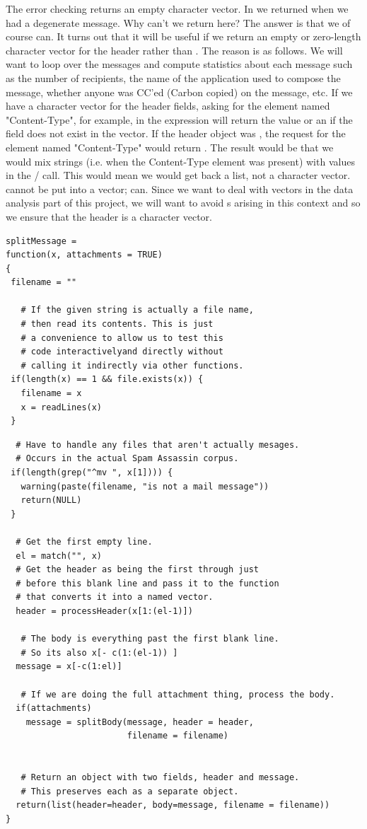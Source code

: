 The error checking returns an empty character vector.  In
 we returned  when
we had a degenerate message.  Why can't we return  here?  The
answer is that we of course can.  It turns out that it will be useful
if we return an empty or zero-length character vector for the header
rather than .  The reason is as follows.  We will want to
loop over the messages and compute statistics about each message such
as the number of recipients, the name of the application used to
compose the message, whether anyone was CC'ed (Carbon copied) on the
message, etc.  If we have a character vector for the header fields,
asking for the element named "Content-Type", for example, in the
expression
 will
return the value or an  if the field does not exist in the
vector.  If the header object was , the request for the
element named "Content-Type" would return .  The result would
be that we would mix strings (i.e. when the Content-Type element was
present) with  values in the
/
call. This would mean we would get back a list, not a character
vector.  cannot be put into a vector;  can. Since we
want to deal with vectors in the data analysis part of this project,
we will want to avoid s arising in this context and so we
ensure that the header is a character vector.

\begin{verbatim}
splitMessage =
function(x, attachments = TRUE)
{
 filename = ""

   # If the given string is actually a file name,
   # then read its contents. This is just
   # a convenience to allow us to test this
   # code interactivelyand directly without
   # calling it indirectly via other functions.
 if(length(x) == 1 && file.exists(x)) {
   filename = x
   x = readLines(x)
 }
\end{verbatim}

\begin{verbatim}
  # Have to handle any files that aren't actually mesages.
  # Occurs in the actual Spam Assassin corpus.
 if(length(grep("^mv ", x[1]))) {
   warning(paste(filename, "is not a mail message"))
   return(NULL)
 }

  # Get the first empty line.
  el = match("", x)
  # Get the header as being the first through just
  # before this blank line and pass it to the function 
  # that converts it into a named vector.
  header = processHeader(x[1:(el-1)]) 

   # The body is everything past the first blank line.
   # So its also x[- c(1:(el-1)) ]
  message = x[-c(1:el)]

   # If we are doing the full attachment thing, process the body.
  if(attachments) 
    message = splitBody(message, header = header, 
                        filename = filename)


   # Return an object with two fields, header and message.
   # This preserves each as a separate object.
  return(list(header=header, body=message, filename = filename))
}
\end{verbatim}

